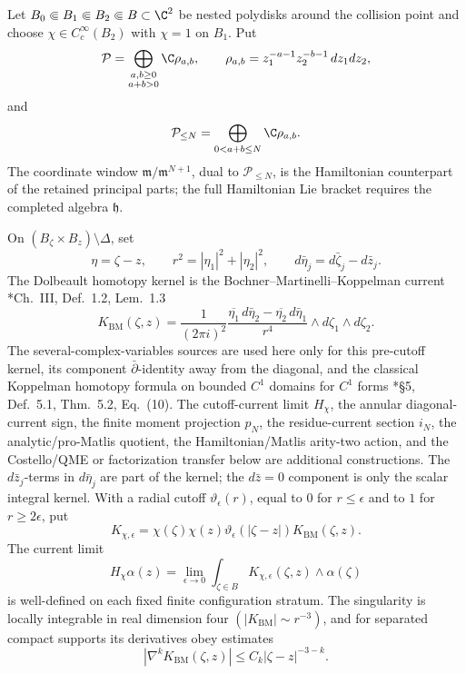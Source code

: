 \documentclass[11pt]{memoir}
\begin{document}
\begin{prop}\label{prop:finite-window-bm-native-e2-transfer}
  Let
  \(B_0\Subset B_1\Subset B_2\Subset B\subset\C^2\) be nested polydisks
  around the collision point and choose
  \(\chi\in C_c^\infty(B_2)\) with \(\chi=1\) on \(B_1\).  Put
  \[
    \mathcal P
      =
      \bigoplus_{\substack{a,b\geq0\\a+b>0}}\C\rho_{a,b},
    \qquad
    \rho_{a,b}=z_1^{-a-1}z_2^{-b-1}\,dz_1dz_2,
  \]
  and
  \[
    \mathcal P_{\leq N}
      =
      \bigoplus_{0<a+b\leq N}\C\rho_{a,b}.
  \]
  The coordinate window \(\mathfrak m/\mathfrak m^{N+1}\), dual to
  \(\mathcal P_{\leq N}\), is the Hamiltonian counterpart of the
  retained principal parts; the full Hamiltonian Lie bracket requires
  the completed algebra \(\mathfrak h\).

  On
  \((B_\zeta\times B_z)\setminus\Delta\), set
  \[
    \eta=\zeta-z,\qquad
    r^2=|\eta_1|^2+|\eta_2|^2,\qquad
    d\bar\eta_j=d\bar\zeta_j-d\bar z_j .
  \]
  The Dolbeault homotopy kernel is the
  Bochner--Martinelli--Koppelman current
  \cite{laurent-thiebaut-bmk}*{Ch.~III, Def.~1.2, Lem.~1.3}
  \[
    K_{\mathrm{BM}}(\zeta,z)
    =
    \frac{1}{(2\pi i)^2}
    \frac{
      \overline{\eta_1}\,d\bar\eta_2
      -
      \overline{\eta_2}\,d\bar\eta_1
    }{r^4}
    \wedge d\zeta_1\wedge d\zeta_2 .
  \]
  The several-complex-variables sources are used here only for
  this pre-cutoff kernel, its component \(\bar\partial\)-identity away
  from the diagonal, and the classical Koppelman homotopy formula on
  bounded \(C^1\) domains for \(C^1\) forms
  \cite{ruppenthal-bmk}*{\S5, Def.~5.1, Thm.~5.2, Eq.~(10)}.  The
  cutoff-current limit \(H_\chi\), the annular diagonal-current sign,
  the finite moment projection \(p_N\), the residue-current section
  \(i_N\), the analytic/pro-Matlis quotient, the Hamiltonian/Matlis
  arity-two action, and the Costello/QME or factorization transfer
  below are additional constructions.
  The \(d\bar z_j\)-terms in \(d\bar\eta_j\) are part of the kernel; the
  \(d\bar z=0\) component is only the scalar integral kernel.  With a
  radial cutoff \(\vartheta_\epsilon(r)\), equal to \(0\) for
  \(r\leq\epsilon\) and to \(1\) for \(r\geq2\epsilon\), put
  \[
    K_{\chi,\epsilon}
      =
      \chi(\zeta)\chi(z)\vartheta_\epsilon(|\zeta-z|)
      K_{\mathrm{BM}}(\zeta,z).
  \]
  The current limit
  \[
    H_\chi\alpha(z)
      =
      \lim_{\epsilon\to0}
      \int_{\zeta\in B}K_{\chi,\epsilon}(\zeta,z)\wedge\alpha(\zeta)
  \]
  is well-defined on each fixed finite configuration stratum.  The
  singularity is locally integrable in real dimension four
  \((|K_{\mathrm{BM}}|\sim r^{-3})\), and for separated compact supports
  its derivatives obey estimates
  \[
    |\nabla^kK_{\mathrm{BM}}(\zeta,z)|
      \leq C_k|\zeta-z|^{-3-k}.
  \]


\end{prop}
\end{document}
